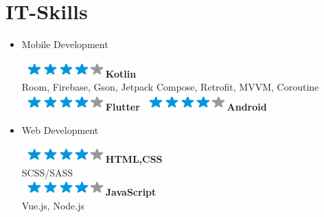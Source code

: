 \documentclass[]{friggeri-cv}
\begin{document}
\section{IT-Skills}
        \vspace*{-0.45cm}
        \setlength{\columnsep}{-0.3cm}
        \begin{flushleft}
        \begin{multicols}{3}
		\begin{itemize}
		
		\setlength{\itemsep}{5pt}
  		\setlength{\parskip}{0pt}
  		\setlength{\parsep}{0pt}
          
        
\item \large Mobile Development \
\normalsize
\begin{flushleft}

\includegraphics[scale=0.40]{res/img/4stars.png}\hspace{1.5mm}\textbf{Kotlin}\\Room, Firebase, Gson, Jetpack Compose, Retrofit, MVVM, Coroutine\\\vspace{2mm}
\includegraphics[scale=0.40]{res/img/4stars.png}\hspace{1.5mm}\textbf{Flutter}
\includegraphics[scale=0.40]{res/img/4stars.png}\hspace{1.5mm}\textbf{Android}
\end{flushleft}            

\item \large Web Development \
\normalsize
\begin{flushleft}

\includegraphics[scale=0.40]{res/img/4stars.png}\hspace{1.5mm}\textbf{HTML,CSS}\\SCSS/SASS\\
\includegraphics[scale=0.40]{res/img/4stars.png}\hspace{1.5mm}\textbf{JavaScript}\\Vue.js, Node.js\\
\end{flushleft}            


\end{itemize}
\end{multicols}
\end{flushleft}
\end{document}
